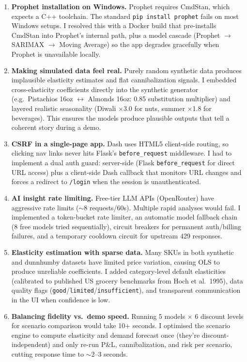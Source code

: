 \documentclass[11pt, a4paper]{article}
\begin{document}
\begin{enumerate}[leftmargin=1.5em]
    \item \textbf{Prophet installation on Windows.} Prophet requires CmdStan, which expects a C++ toolchain. The standard \texttt{pip install prophet} fails on most Windows setups. I resolved this with a Docker build that pre-installs CmdStan into Prophet's internal path, plus a model cascade (Prophet $\rightarrow$ SARIMAX $\rightarrow$ Moving Average) so the app degrades gracefully when Prophet is unavailable locally.

    \item \textbf{Making simulated data feel real.} Purely random synthetic data produces implausible elasticity estimates and flat cannibalization signals. I embedded cross-elasticity coefficients directly into the synthetic generator (e.g.\ Pistachios 16oz $\leftrightarrow$ Almonds 16oz: 0.85 substitution multiplier) and layered realistic seasonality (Diwali $\times$3.0 for nuts, summer $\times$1.8 for beverages). This ensures the models produce plausible outputs that tell a coherent story during a demo.

    \item \textbf{CSRF in a single-page app.} Dash uses HTML5 client-side routing, so clicking nav links never hits Flask's \texttt{before\_request} middleware. I had to implement a dual auth guard: server-side (Flask \texttt{before\_request} for direct URL access) plus a client-side Dash callback that monitors URL changes and forces a redirect to \texttt{/login} when the session is unauthenticated.

    \item \textbf{AI insight rate limiting.} Free-tier LLM APIs (OpenRouter) have aggressive rate limits ($\sim$8 requests/60s). Multiple rapid analyses would fail. I implemented a token-bucket rate limiter, an automatic model fallback chain (8 free models tried sequentially), circuit breakers for permanent auth/billing failures, and a temporary cooldown circuit for upstream 429 responses.

    \item \textbf{Elasticity estimation with sparse data.} Many SKUs in both synthetic and dunnhumby datasets have limited price variation, causing OLS to produce unreliable coefficients. I added category-level default elasticities (calibrated to published US grocery benchmarks from Hoch et al.\ 1995), data quality flags (\texttt{good}/\texttt{limited}/\texttt{insufficient}), and transparent communication in the UI when confidence is low.

    \item \textbf{Balancing fidelity vs.\ demo speed.} Running 5 models $\times$ 6 discount levels for scenario comparison would take 10+ seconds. I optimised the scenario engine to compute elasticity and demand forecast once (they're discount-independent) and only re-run P\&L, cannibalization, and risk per scenario, cutting response time to $\sim$2--3 seconds.
\end{enumerate}
\end{document}
